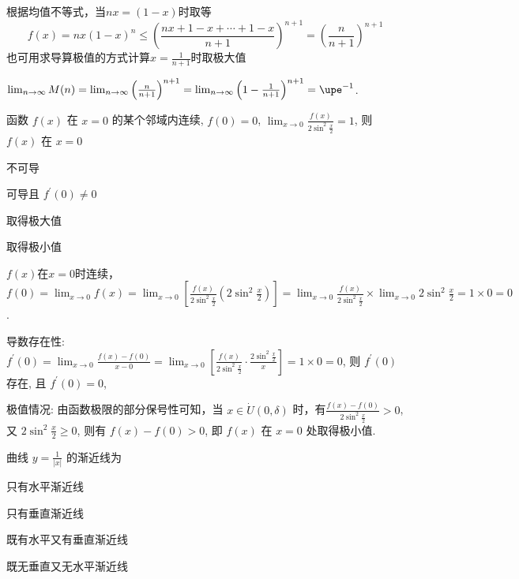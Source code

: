 \documentclass{USTBExam}
\begin{document}
\begin{analysis}
  根据均值不等式，当$nx = (1-x)$时取等
  $$f(x) = nx(1-x)^{n} \le \left( \frac{ nx +1-x + \cdots + 1-x }{n+1} \right)^{n+1} = \left( \frac{n}{n+1} \right)^{n+1}$$
  也可用求导算极值的方式计算$x=\frac{1}{n+1}$时取极大值

  $\lim _{n \to \infty} M(n) = \lim _{n \to \infty} \left( \frac{n}{n+1} \right)^{n+1} = \lim _{n \to \infty} \left( 1-\frac{1}{n+1} \right)^{n+1} = \upe^{-1}$.
\end{analysis}

\begin{problem}
  函数 $f(x)$ 在 $x=0$ 的某个邻域内连续, $f(0)=0$, $\lim _{x \to 0} \frac{f(x)}{2 \sin ^{2} \frac{x}{2}}=1$, 则 $f(x)$ 在 $x=0$
  \paren[D]
  \begin{choices}
    \item 不可导
    \item 可导且 $f^{\prime}(0) \neq 0$
    \item 取得极大值
    \item 取得极小值
  \end{choices}
\end{problem}

\begin{analysis}
  $f(x)$在$x=0$时连续，$f(0) = \lim_{x \to 0} f(x) = \lim _{x \to 0} \left[ \frac{f(x)}{2 \sin ^{2} \frac{x}{2}} \left( 2 \sin ^{2} \frac{x}{2} \right) \right] = \lim _{x \to 0} \frac{f(x)}{2 \sin ^{2} \frac{x}{2}} \times \lim _{x \to 0} 2 \sin ^{2} \frac{x}{2} = 1 \times 0 = 0$.

  导数存在性: $f^{\prime}(0)=\lim _{x \to 0} \frac{f(x)-f(0)}{x-0}
    = \lim _{x \to 0}\left[ \frac{f(x)}{2 \sin ^{2} \frac{x}{2}} \cdot \frac{2 \sin ^{2} \frac{x}{2}}{x} \right]
    = 1 \times 0 = 0$, 则 $f^{\prime}(0)$ 存在, 且 $f^{\prime}(0)=0$,

  极值情况: 由函数极限的部分保号性可知，当 $x \in \dot{U}(0, \delta)$ 时，有$\frac{f(x)-f(0)}{2 \sin ^{2} \frac{x}{2}} > 0$, 又 $2 \sin ^{2} \frac{x}{2} \geqslant 0$, 则有 $f(x)-f(0)>0$, 即 $f(x)$ 在 $x=0$ 处取得极小值.
\end{analysis}

\begin{problem}
  曲线 $y=\frac{1}{|x|}$ 的渐近线为
  \paren[C]
  \begin{choices}
    \item 只有水平渐近线
    \item 只有垂直渐近线
    \item 既有水平又有垂直渐近线
    \item 既无垂直又无水平渐近线
  \end{choices}
\end{problem}
\end{document}
